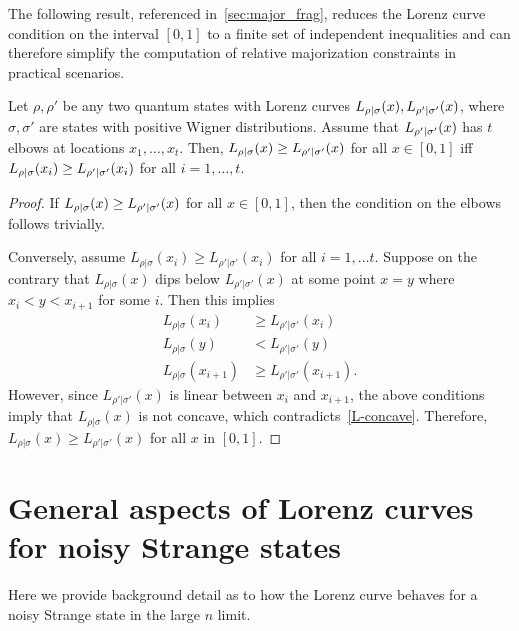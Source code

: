 \documentclass[pra,
aps,
twocolumn,
superscriptaddress,
groupedaddress,
nofootinbib,
reprint
]{revtex4-1}
\begin{document}
The following result, referenced in~\cref{sec:major_frag}, reduces the Lorenz curve condition on the interval $[0,1]$ to a finite set of independent inequalities and can therefore simplify the computation of relative majorization constraints in practical scenarios.
\begin{proposition}\label{thm:elbows}
	Let $\rho, \rho'$ be any two quantum states with Lorenz curves ${L_{\rho|\sigma}}(x), {L_{\rho'|\sigma'}}(x)$, where $\sigma, \sigma'$ are states with positive Wigner distributions. Assume that ${L_{\rho'|\sigma'}}(x)$ has $t$ elbows at locations $x_1, \dots, x_t$. Then, ${L_{\rho|\sigma}}(x) \geq {L_{\rho'|\sigma'}}(x)$ for all $x \in [0,1]$ iff ${L_{\rho|\sigma}}(x_{i}) \geq {L_{\rho'|\sigma'}}(x_{i})$ for all $i =1,\dots,t$.
\end{proposition}
\begin{proof}	
If ${L_{\rho|\sigma}}(x) \geq {L_{\rho'|\sigma'}}(x)$ for all $x \in [0,1]$, then the condition on the elbows follows trivially.

Conversely, assume $L_{\rho|\sigma}(x_i) \geq L_{\rho'|\sigma'}(x_i)$ for all $i=1,\dots t$. 
Suppose on the contrary that $L_{\rho|\sigma}(x)$ dips below $L_{\rho'|\sigma'}(x)$ at some point $x=y$ where $x_i < y < x_{i+1}$ for some $i$. Then this implies
\begin{align}
L_{\rho|\sigma}(x_i) &\ge L_{\rho'|\sigma'}(x_i) \nonumber \\
L_{\rho|\sigma}(y) & <L_{\rho'|\sigma'}(y) \nonumber \\
L_{\rho|\sigma}(x_{i+1}) &\ge L_{\rho'|\sigma'}(x_{i+1}).
\end{align}
However, since $L_{\rho'|\sigma'}(x)$ is linear between $x_i$ and $x_{i+1}$, the above conditions imply that $L_{\rho|\sigma}(x)$ is not concave, which contradicts~\cref{L-concave}. 
Therefore, $L_{\rho|\sigma}(x) \geq L_{\rho'|\sigma'}(x)$ for all $x$ in $[0,1]$.
\end{proof}

\section{General aspects of Lorenz curves for noisy Strange states}
\label{app:lcsu_technical}

Here we provide background detail as to how the Lorenz curve behaves for a noisy Strange state in the large $n$ limit.
\end{document}
